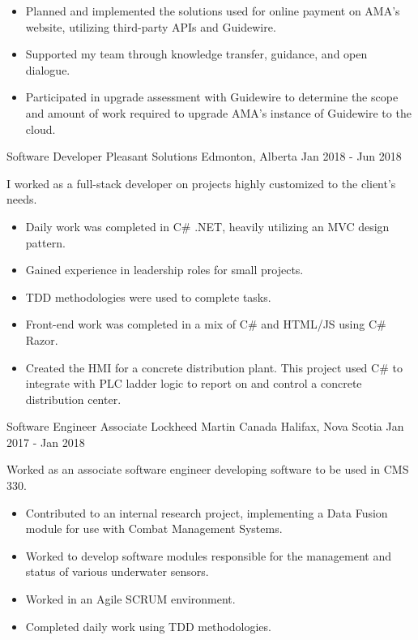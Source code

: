 \begin{cventries}
{\begin{itemize}
                \item Planned and implemented the solutions used for online payment on AMA’s website, utilizing third-party APIs and Guidewire.
                \item Supported my team through knowledge transfer, guidance, and open dialogue.
                \item Participated in upgrade assessment with Guidewire to determine the scope and amount of work required to upgrade AMA's instance of Guidewire to the cloud.
            \end{itemize}
        }
    \cventry
        {Software Developer}
        {Pleasant Solutions}
        {Edmonton, Alberta}
        {Jan 2018 - Jun 2018}
        {
            I worked as a full-stack developer on projects highly customized to the client’s needs.
            \begin{itemize}
                \item Daily work was completed in C\# .NET, heavily utilizing an MVC design pattern.
                \item Gained experience in leadership roles for small projects.
                \item TDD methodologies were used to complete tasks.
                \item Front-end work was completed in a mix of C\# and HTML/JS using C\# Razor.
                \item Created the HMI for a concrete distribution plant.  This project used C\# to integrate with PLC ladder logic to report on and control a concrete distribution center.
            \end{itemize}
        }
    \cventry
        {Software Engineer Associate}
        {Lockheed Martin Canada}
        {Halifax, Nova Scotia}
        {Jan 2017 - Jan 2018}
        {
            Worked as an associate software engineer developing software to be used in CMS 330.
            \begin{itemize}
                \item Contributed to an internal research project, implementing a Data Fusion module for use with Combat Management Systems.
                \item Worked to develop software modules responsible for the management and status of various underwater sensors.
                \item Worked in an Agile SCRUM environment.
                \item Completed daily work using TDD methodologies.

\end{itemize}}
\end{cventries}
